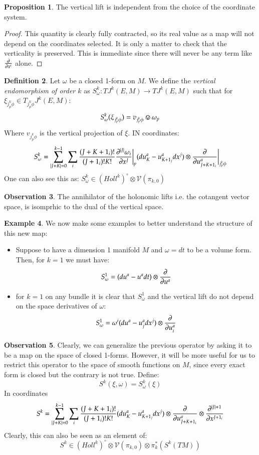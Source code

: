 \documentclass[12pt,a4paper]{report}
\theoremstyle{definition}
\newtheorem{Def}{Definition}[chapter]
\theoremstyle{Theorem}
\newtheorem{Prop}[Def]{Proposition}
\theoremstyle{break}
\newtheorem{Ex}[Def]{Example}
\theoremstyle{definition}
\newtheorem{Obs}[Def]{Observation}
\begin{document}
		\begin{Prop}
			The vertical lift is independent from the choice of the coordinate system.
		\end{Prop}
		\begin{proof}
			This quantity is clearly fully contracted, so its real value as a map will not depend on the coordinates selected. It is only a matter to check that the verticality is preserved. This is immediate since there will never be any term like $\partial\over \partial x^i$ alone.
		\end{proof}
		\begin{Def}
			Let $\omega$ be a closed 1-form on $M$. We define the \textit{vertical endomorphism of order $k$} as $S^k_\omega:TJ^k(E,M)\rightarrow TJ^k(E,M)$ such that for $\xi_{j^k_p\phi}\in T_{j^k_p\phi}J^k(E,M)$:
			$$S^k_\omega(\xi_{j^k_p\phi})=v_{j^k_p\phi}\circledvee \omega_p$$
			Where $v_{j^k_p\phi}$ is the vertical projection of $\xi$. IN coordinates:
			$$S^k_\omega=\sum_{|J+K|=0}^{k-1}\sum_i{(J+K+1_i)!\over (J+1_i)!K!}{\partial^{|J|} \omega_i\over \partial x^J}\bigg|_p(du^a_K-u^a_{K+1_j}dx^j)\otimes {\partial\over \partial u^a_{J+K+1_i}}\bigg|_{j^k_p\phi}$$
			One can also see this as:
			$S^k_\omega\in(Holl^k)^{\circ}\otimes \mathcal{V}(\pi_{k,0})$
		\end{Def}
		\begin{Obs}
			The annihilator of the holonomic lifts i.e. the cotangent vector space, is isomprhic to the dual of the vertical space.
		\end{Obs}
		\begin{Ex}
			We now make some examples to better understand the structure of this new map:
			\begin{itemize}
				\item Suppose to have a dimension 1 manifold $M$ and $\omega=dt$ to be a volume form. Then, for $k=1$ we must have:
				$$S^1_\omega=(du^a-u^adt)\otimes {\partial \over \partial u^a}$$
				\item for $k=1$ on any bundle it is clear that $S^1_\omega$ and the vertical lift do not depend on the space derivatives of $\omega$:
				$$S^1_\omega=\omega^i(du^a-u_j^adx^j)\otimes {\partial \over \partial u^a_i}$$
			\end{itemize}
		\end{Ex}
		\begin{Obs}
			Clearly, we can generalize the previous operator by asking it to be a map on the space of closed 1-forms. However, it will be more useful for us to restrict this operator to the space of smooth functions on $M$, since every exact form is closed but the contrary is not true. Define:
			$$S^k(\xi,\omega)=S^k_\omega(\xi)$$
			In coordinates
			$$S^k=\sum_{|J+K|=0}^{k-1}\sum_i{(J+K+1_i)!\over (J+1_i)!K!}(du^a_K-u^a_{K+1_j}dx^j)\otimes {\partial\over \partial u^a_{J+K+1_i}}\otimes{\partial^{|J|+1} \over \partial x^{J+1_i}}$$
			Clearly, this can also be seen as an element of:
			$$S^k\in (Holl^k)^\circ\otimes \mathcal{V}(\pi_{k,0})\otimes \pi_k^*(S^k(TM))$$
			\end{Obs}
\end{document}
